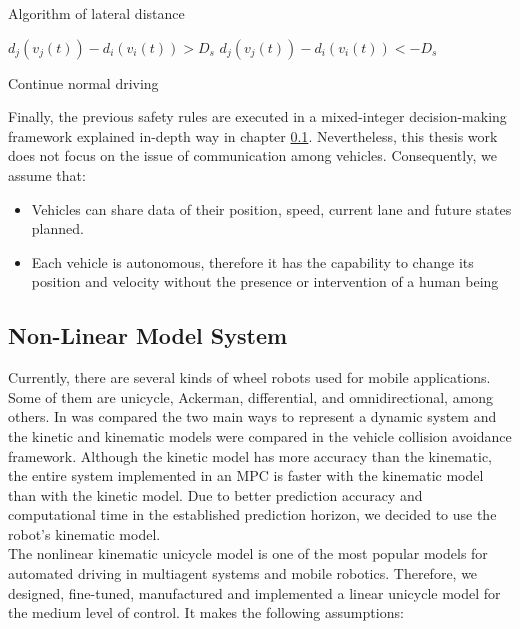 \begin{algorithm}
\caption{Algorithm of lateral distance}\label{alg:lat_saf}
\begin{algorithmic}
        \State $d_j(v_j(t)) -d_i(v_i(t)) > D_s$
        \State $d_j(v_j(t)) -d_i(v_i(t)) < -D_s$
    \Else
        
        \State Continue normal driving
    \EndIf
\EndIf

\end{algorithmic}
\end{algorithm}

Finally,  the previous safety rules are executed in a mixed-integer decision-making framework explained in-depth way in chapter \ref{nonlinear_model}. Nevertheless, this thesis work does not focus on the issue of communication among vehicles. Consequently, we assume that:
\begin{itemize}
\item Vehicles can share data of their position, speed, current lane and future states planned. 
\item Each vehicle is autonomous, therefore it has the capability to change its position and velocity without the presence or intervention of a human being
\end{itemize}











\subsection{Non-Linear Model System}
\label{nonlinear_model}
Currently, there are several kinds of wheel robots used for mobile applications. Some of them are unicycle, Ackerman, differential, and omnidirectional, among others. In \cite{81t} was compared the two main ways to represent a dynamic system and the kinetic and kinematic models were compared in the vehicle collision avoidance framework. Although the kinetic model has more accuracy than the kinematic, the entire system implemented in an MPC is faster with the kinematic model than with the kinetic model. Due to better prediction accuracy and computational time in the established prediction horizon, we decided to use the robot's kinematic model. 
\\
The nonlinear kinematic unicycle model is one of the most popular models for automated driving in multiagent systems \cite{kinematic} and mobile robotics. Therefore, we designed, fine-tuned, manufactured and implemented a linear unicycle model for the medium level of control. It makes the following assumptions:


